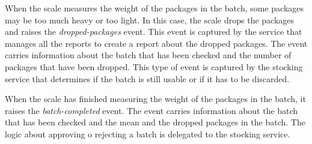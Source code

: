 When the scale measures the weight of the packages in the batch, some packages may be too much heavy or too light.
In this case, the scale drops the packages and raises the \textit{dropped-packages} event.
This event is captured by the service that manages all the reports to create a report about the dropped packages.
The event carries information about the batch that has been checked and the number of packages that have been dropped.
This type of event is captured by the stocking service that determines if the batch is still usable or if it has to be discarded.

When the scale has finished measuring the weight of the packages in the batch, it raises the \textit{batch-completed} event.
The event carries information about the batch that has been checked and the mean and the dropped packages in the batch.
The logic about approving o rejecting a batch is delegated to the stocking service.
